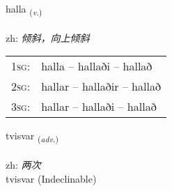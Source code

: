 \documentclass[frontgrid, backgrid]{flacards}\usepackage[]{graphicx}\usepackage[]{color}
\begin{document}
\renewcommand{\flhead}{\vskip5pt \fboxsep=0pt {\small\bfseries\footnotesize Sagnorð | 动词}}
\renewcommand{\fcfoot}{\vskip5pt \fboxsep=0pt \hspace{2pt}{\small\bfseries\footnotesize 2K}}

\renewcommand{\blhead}{\vskip5pt {\small\bfseries\footnotesize Sagnorð | 动词 }}
\renewcommand{\bcfoot}{\vskip5pt \hspace{2pt}{\small\bfseries\footnotesize 2K}}


{halla \small{\textsubscript{(\textit{v.})}} \\[1ex] %
\textphonetic{[hatla]} \\
zh: \emph{倾斜，向上倾斜} \\  [2ex]
\renewcommand*{\arraystretch}{0.8}
\begin{tabular}{p{1cm}l}
\textsc{1sg}: & halla -- hallaði -- hallað \\ 
\textsc{2sg}: & hallar -- hallaðir -- hallað \\ 
\textsc{3sg}: & hallar -- hallaði -- hallað \\ 
\end{tabular}
}


\renewcommand{\flhead}{\vskip5pt \fboxsep=0pt {\small\bfseries\footnotesize Atviksorð | 副词}}
\renewcommand{\fcfoot}{\vskip5pt \fboxsep=0pt \hspace{2pt}{\small\bfseries\footnotesize 2K}}

\renewcommand{\blhead}{\vskip5pt {\small\bfseries\footnotesize Atviksorð | 副词 }}
\renewcommand{\bcfoot}{\vskip5pt \hspace{2pt}{\small\bfseries\footnotesize 2K}}


{tvisvar \small{\textsubscript{(\textit{adv.})}} \\[1ex]
\textphonetic{[tʰvɪːsvar]} \\
zh: \emph{两次} \\  [2ex]
tvisvar (Indeclinable)}

\renewcommand{\flhead}{\vskip5pt \fboxsep=0pt {\small\bfseries\footnotesize Lýsingarorð | 形容词}}
\renewcommand{\fcfoot}{\vskip5pt \fboxsep=0pt \hspace{2pt}{\small\bfseries\footnotesize 2K}}
\end{document}
